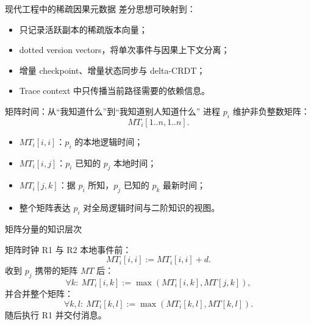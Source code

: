\documentclass[UTF8,fontset=none,aspectratio=169,10pt]{beamer}
\begin{document}
\begin{frame}{现代工程中的稀疏因果元数据}
差分思想可映射到：
\begin{itemize}
  \item 只记录活跃副本的稀疏版本向量；
  \item dotted version vectors，将单次事件与因果上下文分离；
  \item 增量 checkpoint、增量状态同步与 delta-CRDT；
  \item Trace context 中只传播当前路径需要的依赖信息。
\end{itemize}
\vfill
{}
\end{frame}

\begin{frame}{矩阵时间：从“我知道什么”到“我知道别人知道什么”}
进程 $p_i$ 维护非负整数矩阵：
\[
MT_i[1..n,1..n].
\]
\begin{itemize}
  \item $MT_i[i,i]$：$p_i$ 的本地逻辑时间；
  \item $MT_i[i,j]$：$p_i$ 已知的 $p_j$ 本地时间；
  \item $MT_i[j,k]$：据 $p_i$ 所知，$p_j$ 已知的 $p_k$ 最新时间；
  \item 整个矩阵表达 $p_i$ 对全局逻辑时间与二阶知识的视图。
\end{itemize}
\end{frame}

\begin{frame}{矩阵分量的知识层次}
\begin{center}
\end{center}
\vfill
{}
\end{frame}

\begin{frame}{矩阵时钟 R1 与 R2}
本地事件前：
\[
MT_i[i,i]:=MT_i[i,i]+d.
\]
收到 $p_j$ 携带的矩阵 $MT$ 后：
\[
\forall k:\ MT_i[i,k]:=\max(MT_i[i,k],MT[j,k]),
\]
并合并整个矩阵：
\[
\forall k,l:\ MT_i[k,l]:=\max(MT_i[k,l],MT[k,l]).
\]
随后执行 R1 并交付消息。
\end{frame}
\end{document}
